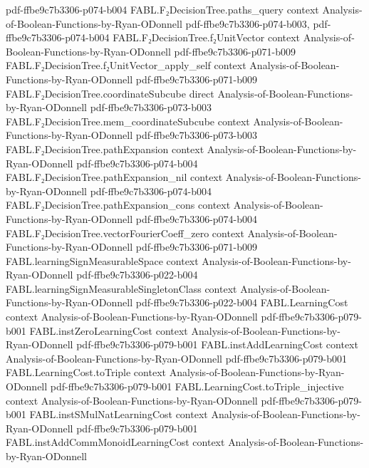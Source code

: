 \begin{theorem}
{    pdf-ffbe9c7b3306-p074-b004}
\proofstep
  {FABL.F₂DecisionTree.paths_query}
  {context}
  {Analysis-of-Boolean-Functions-by-Ryan-ODonnell}
  {pdf-ffbe9c7b3306-p074-b003,
    pdf-ffbe9c7b3306-p074-b004}
\proofstep
  {FABL.F₂DecisionTree.f₂UnitVector}
  {context}
  {Analysis-of-Boolean-Functions-by-Ryan-ODonnell}
  {pdf-ffbe9c7b3306-p071-b009}
\proofstep
  {FABL.F₂DecisionTree.f₂UnitVector_apply_self}
  {context}
  {Analysis-of-Boolean-Functions-by-Ryan-ODonnell}
  {pdf-ffbe9c7b3306-p071-b009}
\proofstep
  {FABL.F₂DecisionTree.coordinateSubcube}
  {direct}
  {Analysis-of-Boolean-Functions-by-Ryan-ODonnell}
  {pdf-ffbe9c7b3306-p073-b003}
\proofstep
  {FABL.F₂DecisionTree.mem_coordinateSubcube}
  {context}
  {Analysis-of-Boolean-Functions-by-Ryan-ODonnell}
  {pdf-ffbe9c7b3306-p073-b003}
\proofstep
  {FABL.F₂DecisionTree.pathExpansion}
  {context}
  {Analysis-of-Boolean-Functions-by-Ryan-ODonnell}
  {pdf-ffbe9c7b3306-p074-b004}
\proofstep
  {FABL.F₂DecisionTree.pathExpansion_nil}
  {context}
  {Analysis-of-Boolean-Functions-by-Ryan-ODonnell}
  {pdf-ffbe9c7b3306-p074-b004}
\proofstep
  {FABL.F₂DecisionTree.pathExpansion_cons}
  {context}
  {Analysis-of-Boolean-Functions-by-Ryan-ODonnell}
  {pdf-ffbe9c7b3306-p074-b004}
\proofstep
  {FABL.F₂DecisionTree.vectorFourierCoeff_zero}
  {context}
  {Analysis-of-Boolean-Functions-by-Ryan-ODonnell}
  {pdf-ffbe9c7b3306-p071-b009}
\proofstep
  {FABL.learningSignMeasurableSpace}
  {context}
  {Analysis-of-Boolean-Functions-by-Ryan-ODonnell}
  {pdf-ffbe9c7b3306-p022-b004}
\proofstep
  {FABL.learningSignMeasurableSingletonClass}
  {context}
  {Analysis-of-Boolean-Functions-by-Ryan-ODonnell}
  {pdf-ffbe9c7b3306-p022-b004}
\proofstep
  {FABL.LearningCost}
  {context}
  {Analysis-of-Boolean-Functions-by-Ryan-ODonnell}
  {pdf-ffbe9c7b3306-p079-b001}
\proofstep
  {FABL.instZeroLearningCost}
  {context}
  {Analysis-of-Boolean-Functions-by-Ryan-ODonnell}
  {pdf-ffbe9c7b3306-p079-b001}
\proofstep
  {FABL.instAddLearningCost}
  {context}
  {Analysis-of-Boolean-Functions-by-Ryan-ODonnell}
  {pdf-ffbe9c7b3306-p079-b001}
\proofstep
  {FABL.LearningCost.toTriple}
  {context}
  {Analysis-of-Boolean-Functions-by-Ryan-ODonnell}
  {pdf-ffbe9c7b3306-p079-b001}
\proofstep
  {FABL.LearningCost.toTriple_injective}
  {context}
  {Analysis-of-Boolean-Functions-by-Ryan-ODonnell}
  {pdf-ffbe9c7b3306-p079-b001}
\proofstep
  {FABL.instSMulNatLearningCost}
  {context}
  {Analysis-of-Boolean-Functions-by-Ryan-ODonnell}
  {pdf-ffbe9c7b3306-p079-b001}
\proofstep
  {FABL.instAddCommMonoidLearningCost}
  {context}
  {Analysis-of-Boolean-Functions-by-Ryan-ODonnell}

\end{theorem}
